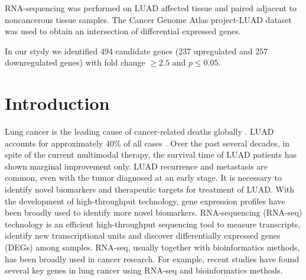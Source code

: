 \documentclass[
10pt, %
a4paper, %
oneside, %
headinclude,footinclude, %
BCOR5mm, %
]{scrartcl}
\begin{document}
RNA-sequencing was performed on LUAD affected tissue and paired adjacent to noncancerous tissue samples. The Cancer Genome Atlas project-LUAD dataset was used to obtain an intersection of differential expressed genes.

In our stydy we identified $494$ candidate genes ($237$ upregulated and $257$ downregulated genes) with fold change $\ge 2.5$ and $p \le 0.05$.


\newpage %


\section{Introduction}

Lung cancer is the leading cause of cancer-related deaths globally \cite{article:1}. LUAD accounts for approximately 40\% of all cases \cite{article:2}. Over the past several decades, in spite of the current multimodal therapy, the survival time of LUAD patients has shown marginal improvement only. LUAD recurrence and metastasis are common, even with the tumor diagnosed at an early stage. \cite{article:3}  It is necessary to identify novel biomarkers and therapeutic targets for treatment of LUAD. With the development of high-throughput technology, gene expression profiles have been broadly used to identify more novel biomarkers. RNA-sequencing (RNA-seq) technology is an efficient high-throughput sequencing tool to measure transcripts, identify new transcriptional units and discover differentially expressed genes (DEGs) among samples. RNA-seq, usually together with bioinformatics methods, has been broadly used in cancer research. For example, recent studies have found several key genes in lung cancer using RNA-seq and bioinformatics methods. \cite{article:4} \cite{article:5}


 
\end{document}

